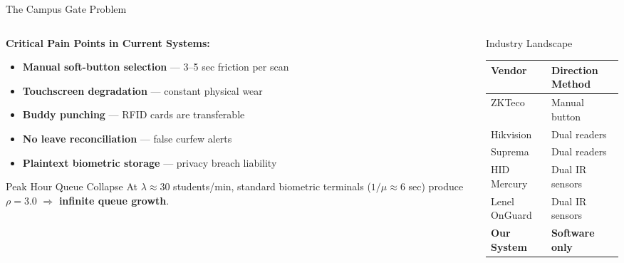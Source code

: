 \documentclass[aspectratio=169, 11pt]{beamer}
\begin{document}
\begin{frame}{The Campus Gate Problem}
  \begin{columns}[T]
    \begin{column}{0.55\textwidth}
      \textbf{Critical Pain Points in Current Systems:}
      \begin{itemize}
        \item \textcolor{DangerRed}{\faTimesCircle} \textbf{Manual soft-button selection} — 3--5 sec friction per scan
        \item \textcolor{DangerRed}{\faTimesCircle} \textbf{Touchscreen degradation} — constant physical wear
        \item \textcolor{DangerRed}{\faTimesCircle} \textbf{Buddy punching} — RFID cards are transferable
        \item \textcolor{DangerRed}{\faTimesCircle} \textbf{No leave reconciliation} — false curfew alerts
        \item \textcolor{DangerRed}{\faTimesCircle} \textbf{Plaintext biometric storage} — privacy breach liability
      \end{itemize}
      \vspace{0.3em}
      \begin{alertblock}{Peak Hour Queue Collapse}
        At $\lambda \approx 30$ students/min, standard biometric terminals ($1/\mu \approx 6$ sec) produce $\rho = 3.0$ $\Rightarrow$ \textbf{infinite queue growth}.
      \end{alertblock}
    \end{column}
    \begin{column}{0.42\textwidth}
      \begin{block}{Industry Landscape}
        \small
        \begin{tabular}{ll}
          \toprule
          \textbf{Vendor} & \textbf{Direction Method} \\
          \midrule
          ZKTeco & Manual button \\
          Hikvision & Dual readers \\
          Suprema & Dual readers \\
          HID Mercury & Dual IR sensors \\
          Lenel OnGuard & Dual IR sensors \\
          \midrule
          \textbf{Our System} & \textcolor{CodeGreen}{\textbf{Software only}} \\
          \bottomrule
        \end{tabular}
      \end{block}
    \end{column}
  \end{columns}
\end{frame}
\end{document}
